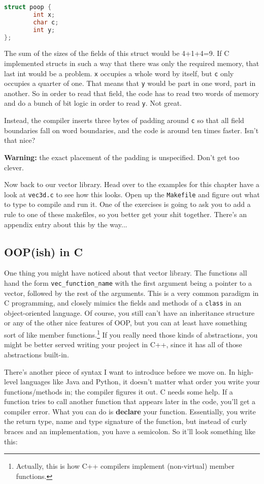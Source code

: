 \documentclass[ebook,11pt,oneside,openany]{memoir}
\newcommand{\cf}[1]{\texttt{#1}}
\begin{document}
\begin{lstlisting}[language=C]
struct poop {
        int x;
        char c;
        int y;
};
\end{lstlisting}

The sum of the sizes of the fields of this struct would be 4+1+4=9. If C implemented structs in such a way that there was only the required memory, that last int would be a problem. \cf{x} occupies a whole word by itself, but \cf{c} only occupies a quarter of one. That means that \cf{y} would be part in one word, part in another. So in order to read that field, the code has to read two words of memory and do a bunch of bit logic in order to read \cf{y}. Not great.

Instead, the compiler inserts three bytes of padding around \cf{c} so that all field boundaries fall on word boundaries, and the code is around ten times faster. Isn't that nice?

\noindent
\textbf{Warning:} the exact placement of the padding is unspecified. Don't get too clever.


Now back to our vector library. Head over to the examples for this chapter have a look at \cf{vec3d.c} to see how this looks. Open up the \cf{Makefile} and figure out what to type to compile and run it. One of the exercises is going to ask you to add a rule to one of these makefiles, so you better get your shit together. There's an appendix entry about this by the way...

\subsection{OOP(ish) in C}

One thing you might have noticed about that vector library. The functions all hand the form \cf{vec\_function\_name} with the first argument being a pointer to a vector, followed by the rest of the arguments. This is a very common paradigm in C programming, and closely mimics the fields and methods of a \cf{class} in an object-oriented language. Of course, you still can't have an inheritance structure or any of the other nice features of OOP, but you can at least have something sort of like member functions.\footnote{Actually, this is how C++ compilers implement (non-virtual) member functions.} If you really need those kinds of abstractions, you might be better served writing your project in C++, since it has all of those abstractions built-in.

There's another piece of syntax I want to introduce before we move on. In high-level languages like Java and Python, it doesn't matter what order you write your functions/methods in; the compiler figures it out. C needs some help. If a function tries to call another function that appears later in the code, you'll get a compiler error. What you can do is \textbf{declare} your function. Essentially, you write the return type, name and type signature of the function, but instead of curly braces and an implementation, you have a semicolon. So it'll look something like this:
\end{document}
